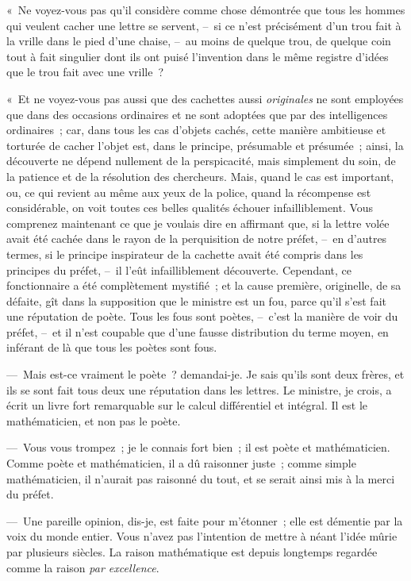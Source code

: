 \documentclass[french,twoside]{book} %
\begin{document}
« Ne voyez-vous pas qu’il considère comme chose démontrée que tous les hommes qui veulent cacher une lettre se servent, – si ce n’est précisément d’un trou fait à la vrille dans le pied d’une chaise, – au moins de quelque trou, de quelque coin tout à fait singulier dont ils ont puisé l’invention dans le même registre d’idées que le trou fait avec une vrille ?\par
« Et ne voyez-vous pas aussi que des cachettes aussi \emph{originales} ne sont employées que dans des occasions ordinaires et ne sont adoptées que par des intelligences ordinaires ; car, dans tous les cas d’objets cachés, cette manière ambitieuse et torturée de cacher l’objet est, dans le principe, présumable et présumée ; ainsi, la découverte ne dépend nullement de la perspicacité, mais simplement du soin, de la patience et de la résolution des chercheurs. Mais, quand le cas est important, ou, ce qui revient au même aux yeux de la police, quand la récompense est considérable, on voit toutes ces belles qualités échouer infailliblement. Vous comprenez maintenant ce que je voulais dire en affirmant que, si la lettre volée avait été cachée dans le rayon de la perquisition de notre préfet, – en d’autres termes, si le principe inspirateur de la cachette avait été compris dans les principes du préfet, – il l’eût infailliblement découverte. Cependant, ce fonctionnaire a été complètement mystifié ; et la cause première, originelle, de sa défaite, gît dans la supposition que le ministre est un fou, parce qu’il s’est fait une réputation de poète. Tous les fous sont poètes, – c’est la manière de voir du préfet, – et il n’est coupable que d’une fausse distribution du terme moyen, en inférant de là que tous les poètes sont fous.\par
— Mais est-ce vraiment le poète ? demandai-je. Je sais qu’ils sont deux frères, et ils se sont fait tous deux une réputation dans les lettres. Le ministre, je crois, a écrit un livre fort remarquable sur le calcul différentiel et intégral. Il est le mathématicien, et non pas le poète.\par
— Vous vous trompez ; je le connais fort bien ; il est poète et mathématicien. Comme poète et mathématicien, il a dû raisonner juste ; comme simple mathématicien, il n’aurait pas raisonné du tout, et se serait ainsi mis à la merci du préfet.\par
— Une pareille opinion, dis-je, est faite pour m’étonner ; elle est démentie par la voix du monde entier. Vous n’avez pas l’intention de mettre à néant l’idée mûrie par plusieurs siècles. La raison mathématique est depuis longtemps regardée comme la raison \emph{par excellence}.\par
\end{document}
